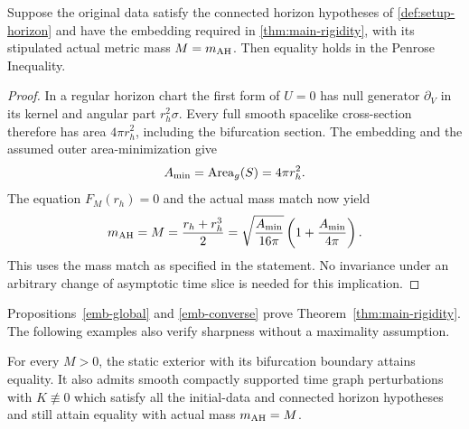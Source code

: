 \begin{proposition}
\label{emb-converse}
Suppose the original data satisfy the connected horizon hypotheses
of \cref{def:setup-horizon} and have the embedding required in
\cref{thm:main-rigidity}, with its stipulated actual metric mass
$M=m_{\mathrm{AH}}$.  Then equality holds in the Penrose Inequality.
\end{proposition}

\begin{proof}
In a regular horizon chart the first form of $U=0$ has null
generator $\partial_V$ in its kernel and angular part
$r_h^2\sigma$.  Every full smooth spacelike cross-section therefore
has area $4\pi r_h^2$, including the bifurcation section.  The
embedding and the assumed outer area-minimization give
\[
 A_{\min}=\operatorname{Area}_g(S)=4\pi r_h^2.
\]
The equation $F_M(r_h)=0$ and the actual mass match now yield
\[
 m_{\mathrm{AH}}=M=\frac{r_h+r_h^3}{2}
 =\sqrt{\frac{A_{\min}}{16\pi}}
  \left(1+\frac{A_{\min}}{4\pi}\right).
\]
This uses the mass match as specified in the statement.  No
invariance under an arbitrary change of asymptotic time slice is
needed for this implication.
\end{proof}

Propositions~\ref{emb-global} and \ref{emb-converse} prove
Theorem~\ref{thm:main-rigidity}. The following examples also verify
sharpness without a maximality assumption.

\begin{proposition}
\label{emb-examples}
For every $M>0$, the static exterior with its bifurcation boundary
attains equality.  It also admits smooth compactly supported time
graph perturbations with $K\not\equiv0$ which satisfy all the
initial-data and connected horizon hypotheses and still attain
equality with actual mass $m_{\mathrm{AH}}=M$.
\end{proposition}

